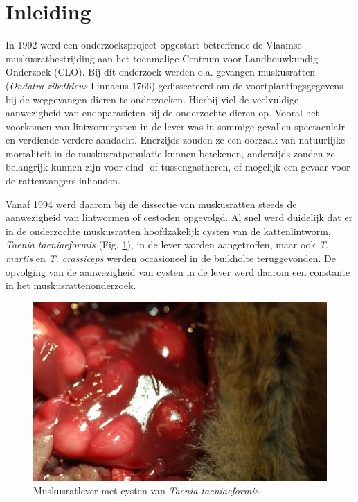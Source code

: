 \documentclass[twoside]{extreport}
\begin{document}
\section{Inleiding}\label{inleiding}

In 1992 werd een onderzoeksproject opgestart betreffende de Vlaamse
muskusratbestrijding aan het toenmalige Centrum voor Landbouwkundig
Onderzoek (CLO). Bij dit onderzoek werden o.a. gevangen muskusratten
(\emph{Ondatra zibethicus} Linnaeus 1766) gedissecteerd om de
voortplantingsgegevens bij de weggevangen dieren te onderzoeken. Hierbij
viel de veelvuldige aanwezigheid van endoparasieten bij de onderzochte
dieren op. Vooral het voorkomen van lintwormcysten in de lever was in
sommige gevallen spectaculair en verdiende verdere aandacht. Enerzijds
zouden ze een oorzaak van natuurlijke mortaliteit in de
muskusratpopulatie kunnen betekenen, anderzijds zouden ze belangrijk
kunnen zijn voor eind- of tussengastheren, of mogelijk een gevaar voor
de rattenvangers inhouden.

Vanaf 1994 werd daarom bij de dissectie van muskusratten steeds de
aanwezigheid van lintwormen of cestoden opgevolgd. Al snel werd
duidelijk dat er in de onderzochte muskusratten hoofdzakelijk cysten van
de kattenlintworm, \emph{Taenia taeniaeformis} (Fig.
\ref{fig:Muskusratlever}), in de lever worden aangetroffen, maar ook
\emph{T. martis} en \emph{T. crassiceps} werden occasioneel in de
buikholte teruggevonden. De opvolging van de aanwezigheid van cysten in
de lever werd daarom een constante in het muskusrattenonderzoek.




\begin{figure}

{\centering \includegraphics[width=0.6\linewidth]{Taenia_cysten} 

}

\caption{Muskusratlever met cysten van \emph{Taenia
taeniaeformis}.}\label{fig:Muskusratlever}
\end{figure}
\end{document}
